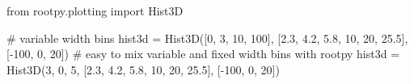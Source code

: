\begin{footnotesize}
\begin{pyglist}[language=python,texcl=true,abovecaptionskip=0,style=vs,bgcolor=Moccasin]
from rootpy.plotting import Hist3D

# variable width bins
hist3d = Hist3D([0, 3, 10, 100], [2.3, 4.2, 5.8, 10, 20, 25.5], [-100, 0, 20])
# easy to mix variable and fixed width bins with rootpy
hist3d = Hist3D(3, 0, 5, [2.3, 4.2, 5.8, 10, 20, 25.5], [-100, 0, 20])
\end{pyglist}
\end{footnotesize}

